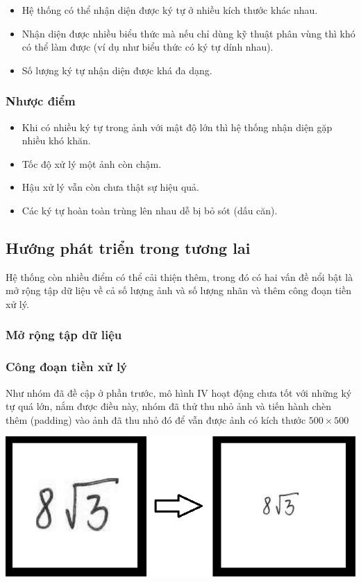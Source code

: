\documentclass[a4paper,12pt]{article}
\begin{document}
	\begin{itemize}
		\item Hệ thống có thể nhận diện được ký tự ở nhiều kích thước khác nhau.
		\item Nhận diện được nhiều biểu thức mà nếu chỉ dùng kỹ thuật phân vùng thì khó có thể làm được (ví dụ như biểu thức có ký tự dính nhau).
		\item Số lượng ký tự nhận diện được khá đa dạng.
	\end{itemize}
	
	\subsubsection{Nhược điểm}
	
	\begin{itemize}
		\item Khi có nhiều ký tự trong ảnh với mật độ lớn thì hệ thống nhận diện gặp nhiều khó khăn.
		\item Tốc độ xử lý một ảnh còn chậm.
		\item Hậu xử lý vẫn còn chưa thật sự hiệu quả.
		\item Các ký tự hoàn toàn trùng lên nhau dễ bị bỏ sót (dấu căn).
	\end{itemize}
	\subsection{Hướng phát triển trong tương lai}
	
	Hệ thống còn nhiều điểm có thể cải thiện thêm, trong đó có hai vấn đề nổi bật là mở rộng tập dữ liệu về cả số lượng ảnh và số lượng nhãn và thêm công đoạn tiền xử lý.
	
	\subsubsection{Mở rộng tập dữ liệu}
	
	\subsubsection{Công đoạn tiền xử lý}
	
	Như nhóm đã đề cập ở phần trước, mô hình IV hoạt động chưa tốt với những ký tự quá lớn, nắm được điều này, nhóm đã thử thu nhỏ ảnh và tiến hành chèn thêm (padding) vào ảnh đã thu nhỏ đó để vẫn được ảnh có kích thước $500 \times 500$ 
	
	\begin{center}
		\centering
		\includegraphics[width=0.775\linewidth]{ensmall.png}
		\vspace{0.5cm}
		
	\end{center}
	
\end{document}
